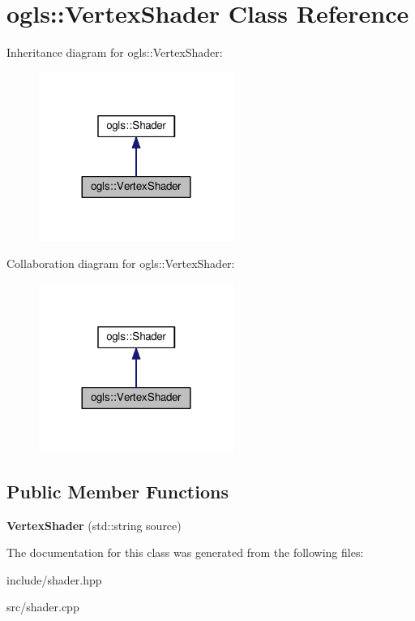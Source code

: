 \hypertarget{classogls_1_1VertexShader}{\section{ogls\-:\-:Vertex\-Shader Class Reference}
\label{classogls_1_1VertexShader}
}


Inheritance diagram for ogls\-:\-:Vertex\-Shader\-:
\nopagebreak
\begin{figure}[H]
\begin{center}
\leavevmode
\includegraphics[width=180pt]{df/d56/classogls_1_1VertexShader__inherit__graph}
\end{center}
\end{figure}


Collaboration diagram for ogls\-:\-:Vertex\-Shader\-:
\nopagebreak
\begin{figure}[H]
\begin{center}
\leavevmode
\includegraphics[width=180pt]{d3/d62/classogls_1_1VertexShader__coll__graph}
\end{center}
\end{figure}
\subsection*{Public Member Functions}
\begin{DoxyCompactItemize}
\item 
\hypertarget{classogls_1_1VertexShader_aed076b75f98fef94a264f3523a68c603}{{\bfseries Vertex\-Shader} (std\-::string source)}\label{classogls_1_1VertexShader_aed076b75f98fef94a264f3523a68c603}

\end{DoxyCompactItemize}


The documentation for this class was generated from the following files\-:\begin{DoxyCompactItemize}
\item 
include/shader.\-hpp\item 
src/shader.\-cpp\end{DoxyCompactItemize}
